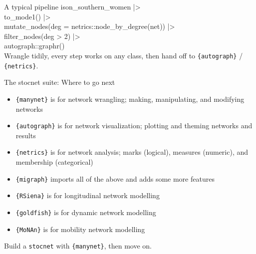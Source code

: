 \documentclass[9pt]{extarticle}
\let\code\verb
\begin{document}
\begin{minipage}[t]{0.323\textwidth}
\begin{mnbox}{A typical pipeline}
{\ttfamily\scriptsize
ison\_southern\_women |>\\
\hspace*{1em}to\_mode1() |>\\
\hspace*{1em}mutate\_nodes(deg = netrics::node\_by\_degree(net)) |>\\
\hspace*{1em}filter\_nodes(deg > 2) |>\\
\hspace*{1em}autograph::graphr()}\\[2pt]
{\scriptsize Wrangle tidily, every step works on any class, then hand off to \code|{autograph}| /
\code|{netrics}|.}
\end{mnbox}

\begin{greybox}{The stocnet suite: Where to go next}
\begin{itemize}
\item \code|{manynet}| is for network wrangling; making, manipulating, and modifying networks\\
\item \code|{autograph}| is for network visualization; plotting and theming networks and results\\
\item \code|{netrics}| is for network analysis; marks (logical), measures (numeric), and membership (categorical)\\
\item \code|{migraph}| imports all of the above and adds some more features\\
\item \code|{RSiena}| is for longitudinal network modelling\\
\item \code|{goldfish}| is for dynamic network modelling\\
\item \code|{MoNAn}| is for mobility network modelling\\
\end{itemize}
Build a \code|stocnet| with \code|{manynet}|, then move on.
\end{greybox}

\end{minipage}
\end{document}
